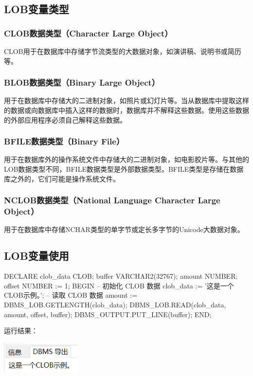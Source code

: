 \documentclass[11pt, a4paper, oneside, UTF8]{ctexbook}
\begin{document}
\subsection{LOB变量类型}
\subsubsection{CLOB数据类型（Character Large Object）}
CLOB用于在数据库中存储字节流类型的大数据对象，如演讲稿、说明书或简历等。
\subsubsection{BLOB数据类型（Binary Large Object）}
用于在数据库中存储大的二进制对象，如照片或幻灯片等。当从数据库中提取这样的数据或向数据库中插入这样的数据时，数据库并不解释这些数据。使用这些数据的外部应用程序必须自己解释这些数据。
\subsubsection{BFILE数据类型（Binary File）}
用于在数据库外的操作系统文件中存储大的二进制对象，如电影胶片等。与其他的LOB数据类型不同，BFILE数据类型是外部数据类型。BFILE类型是存储在数据库之外的，它们可能是操作系统文件。
\subsubsection{NCLOB数据类型（National Language Character Large Object）}用于在数据库中存储NCHAR类型的单字节或定长多字节的Unicode大数据对象。
\subsection{LOB变量使用}
\begin{plsql}[caption=LOB变量使用示例代码]
DECLARE
  clob_data CLOB;
  buffer VARCHAR2(32767);
  amount NUMBER;
  offset NUMBER := 1;
BEGIN
  -- 初始化 CLOB 数据
  clob_data := '这是一个CLOB示例。';
  -- 读取 CLOB 数据
  amount := DBMS_LOB.GETLENGTH(clob_data);
  DBMS_LOB.READ(clob_data, amount, offset, buffer);
  DBMS_OUTPUT.PUT_LINE(buffer);
END;
\end{plsql}

运行结果：
\begin{center}
  \begin{minipage}{\textwidth}
    \center
    \includegraphics[width=0.3\textwidth]{picture/CLOB示例.png}
    \captionsetup{hypcap=false}
    \label{fig:CLOB示例}
  \end{minipage}
\end{center}
\end{document}
